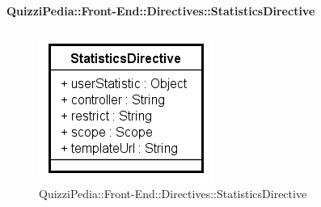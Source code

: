 \paragraph{QuizziPedia::Front-End::Directives::StatisticsDirective}

\label{QuizziPedia::Front-End::Directives::StatisticsDirective}

\begin{figure}[h]
	\centering
	\includegraphics[scale=0.80,keepaspectratio]{UML/Classi/Front-End/QuizziPedia_Front-end_Directives_StatisticsDirective.png}
	\caption{QuizziPedia::Front-End::Directives::StatisticsDirective}
\end{figure}

